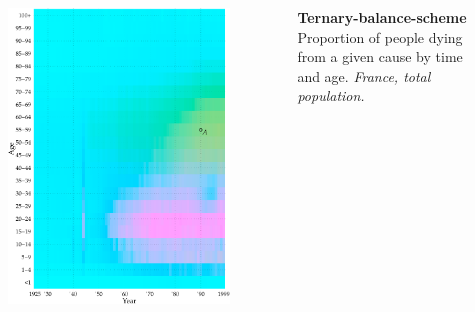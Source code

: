 \documentclass{beamer}
\begin{document}
\begin{frame}
\frametitle{\insertsection}

\begin{columns}[c]

\begin{figure}[htb!]
\includegraphics[width = 0.97\textwidth]{../fig/plot-tern_balance_no_lgnd.pdf}
\end{figure}

\small \textbf{Ternary-balance-scheme}\\ Proportion of people dying from a given cause by time and age. \scriptsize\emph{France, total population.}


\end{columns}
\end{frame}
\end{document}
